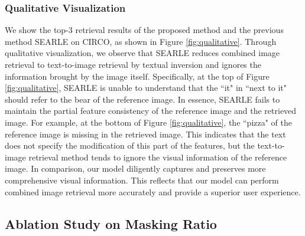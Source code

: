 \documentclass[10pt,twocolumn,letterpaper]{article}
\begin{document}
\subsubsection{Qualitative Visualization}
We show the top-3 retrieval results of the proposed method and the previous method SEARLE \cite{Baldrati_2023_ICCV} on CIRCO, as shown in Figure \ref{fig:qualitative}. Through qualitative visualization, we observe that SEARLE reduces combined image retrieval to text-to-image retrieval by textual inversion and ignores the information brought by the image itself. Specifically, at the top of Figure \ref{fig:qualitative}, SEARLE is unable to understand that the ``it" in ``next to it" should refer to the bear of the reference image. In essence, SEARLE fails to maintain the partial feature consistency of the reference image and the retrieved image. For example, at the bottom of Figure \ref{fig:qualitative}, the ``pizza" of the reference image is missing in the retrieved image. This indicates that the text does not specify the modification of this part of the features, but the text-to-image retrieval method tends to ignore the visual information of the reference image. In comparison, our model diligently captures and preserves more comprehensive visual information. This reflects that our model can perform combined image retrieval more accurately and provide a superior user experience.

\subsection{Ablation Study on Masking Ratio}

\begin{table}[!ht]
\centering
  \caption{Ablation study of masking ratio  to our method on the FashionIQ dataset.  The best scores are highlighted in bold.}
  \label{tab:mask ratio}
\end{table}
\end{document}
